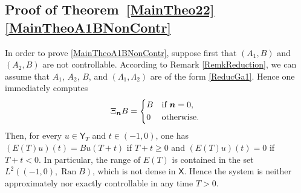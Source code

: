\documentclass[10pt]{article}
\newcommand{\bn}{\boldsymbol{n}}
\theoremstyle{plain}
\theoremstyle{definition}
\DeclareMathOperator{\range}{Ran}
\numberwithin{equation}{section}\numberwithin{figure}{section}\emergencystretch=3em
\begin{document}
\subsection{Proof of Theorem~\ref{MainTheo22}\eqref{MainTheoA1BNonContr}}

In order to prove \eqref{MainTheoA1BNonContr}, suppose first that $(A_1, B)$ and $(A_2, B)$ are not controllable. According to Remark \ref{RemkReduction}, we can assume that $A_1$, $A_2$, $B$, and $(\Lambda_1, \Lambda_2)$ are of the form \eqref{ReducGa1}. Hence one immediately computes
\[
\Xi_{\bn} B =
\begin{dcases*}
B & if $\bn = 0$, \\
0 & otherwise.
\end{dcases*}
\]
Then, for every $u \in \mathsf Y_T$ and $t \in (-1, 0)$, one has $(E(T) u)(t) = B u(T + t)$ if $T + t \geq 0$ and $(E(T) u)(t) = 0$ if $T + t < 0$. In particular, the range of $E(T)$ is contained in the set $L^2((-1, 0), \range B)$, which is not dense in $\mathsf X$. Hence the system is neither approximately nor exactly controllable in any time $T > 0$.
\end{document}
